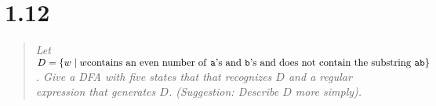 \section{1.12}

\begin{quote}\color{black!80}\slshape
  Let $D = \{ w \mid w \text{contains an even number of \texttt{a}'s and
  \texttt{b}'s and does not contain the substring \texttt{ab}}\}$. Give a DFA with
  five states that that recognizes $D$ and a regular expression that generates $D$.
  (Suggestion: Describe $D$ more simply). \cite[p.~85]{Sipser}
\end{quote}
